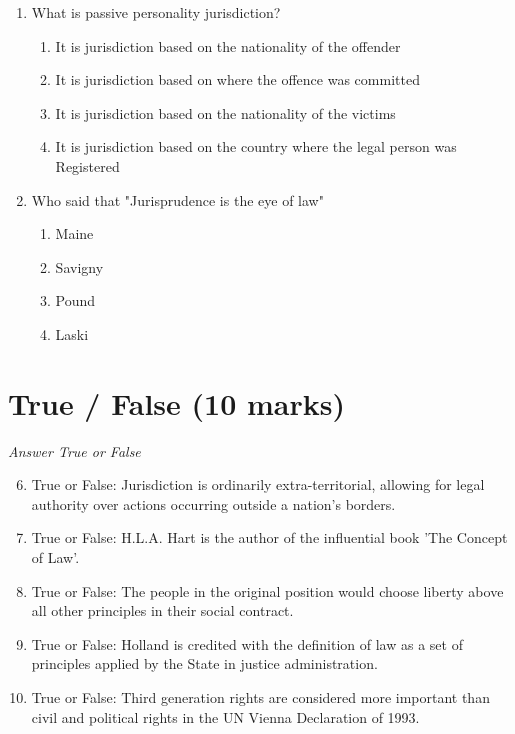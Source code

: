\documentclass[12pt]{article}
\begin{document}
\begin{enumerate}[label=\arabic*.]
\begin{enumerate}[label=(\alph*)]
\end{enumerate}
\item What is passive personality jurisdiction?
\begin{enumerate}[label=(\alph*)]
    \item It is jurisdiction based on the nationality of the offender
    \item It is jurisdiction based on where the offence was committed
    \item It is jurisdiction based on the nationality of the victims
    \item It is jurisdiction based on the country where the legal person was Registered
\end{enumerate}
\item Who said that "Jurisprudence is the eye of law"
\begin{enumerate}[label=(\alph*)]
    \item Maine
    \item Savigny
    \item Pound
    \item Laski
\end{enumerate}
\end{enumerate}

\section*{True / False (10 marks)}
\textit{Answer True or False}
\begin{enumerate}[label=\arabic*.]
\setcounter{enumi}{5}
\item True or False: Jurisdiction is ordinarily extra-territorial, allowing for legal authority over actions occurring outside a nation's borders.
\item True or False: H.L.A. Hart is the author of the influential book 'The Concept of Law'.
\item True or False: The people in the original position would choose liberty above all other principles in their social contract.
\item True or False: Holland is credited with the definition of law as a set of principles applied by the State in justice administration.
\item True or False: Third generation rights are considered more important than civil and political rights in the UN Vienna Declaration of 1993.
\end{enumerate}
\end{document}
